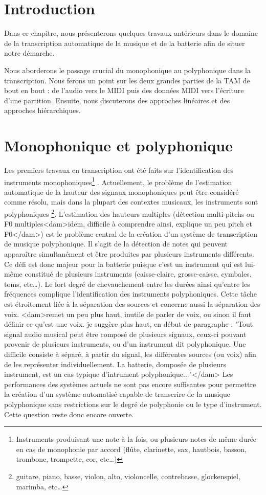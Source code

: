 \section*{Introduction}
Dans ce chapitre, nous présenterons quelques travaux antérieurs dans le domaine
de la transcription automatique de la musique et de la batterie afin de situer
notre démarche.

Nous aborderons le passage crucial du monophonique au polyphonique dans la
transcription. Nous ferons un point sur les deux grandes parties de la TAM de
bout en bout : de l’audio vers le MIDI puis des données MIDI vers l’écriture
d’une partition. Ensuite, nous discuterons des approches linéaires et des
approches hiérarchiques.

\section{Monophonique et polyphonique}
Les premiers travaux en transcription ont été faits sur l’identification des
instruments monophoniques\footnote{Instruments produisant une note à la fois,
ou plusieurs notes de même durée en cas de monophonie par accord (flûte,
clarinette, sax, hautbois, basson, trombone, trompette, cor, etc…)}
\cite{future_directions}. Actuellement, le problème de l'estimation automatique
de la hauteur des signaux monophoniques peut être considéré comme résolu, mais
dans la plupart des contextes musicaux, les instruments sont polyphoniques
\footnote{guitare, piano, basse, violon, alto, violoncelle, contrebasse,
glockenspiel, marimba, etc…}. L'estimation des hauteurs multiples (détection
multi-pitchs ou F0 multiples<dam>idem, difficile à comprendre ainsi, explique
un peu pitch et F0</dam>) est le problème central de la création d'un
système de transcription de musique polyphonique. Il s’agit de la détection de
notes qui peuvent apparaître simultanément et être produites par plusieurs
instruments différents. Ce défi est donc majeur pour la batterie puisque c’est
un instrument qui est lui-même constitué de plusieurs instruments
(caisse-claire, grosse-caisse, cymbales, toms, etc…). Le fort degré de
chevauchement entre les durées ainsi qu’entre les fréquences complique
l’identification des instruments polyphoniques. Cette tâche est étroitement
liée à la séparation des sources et concerne aussi la séparation des voix.
<dam>remet un peu plus haut, inutile de parler de voix, ou sinon il faut
définir ce qu'est une voix. je suggère plus haut, en début de paragraphe :
"Tout signal audio musical peut être composé de plusieurs signaux, ceux-ci
pouvant provenir de plusieurs instruments, ou d'un instrument dit polyphonique.
Une difficile consiste à séparé, à partir du signal, les différentes sources
(ou voix) afin de les représenter individuellement. La batterie, domposée de
plusieurs instrument, est un cas typique d'intrument polyphonique..."</dam>
Les performances des systèmes actuels ne sont pas encore suffisantes pour
permettre la création d'un système automatisé capable de transcrire de la
musique polyphonique sans restrictions sur le degré de polyphonie ou le type
d'instrument. Cette question reste donc encore ouverte. 

